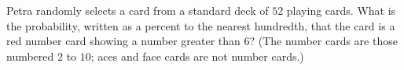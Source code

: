 Petra randomly selects a card from a standard deck of $52$ playing cards. What is the probability, written as a percent to the nearest hundredth, that the card is a red number card showing a number greater than $6$? (The number cards are those numbered $2$ to $10$; aces and face cards are not number cards.)
